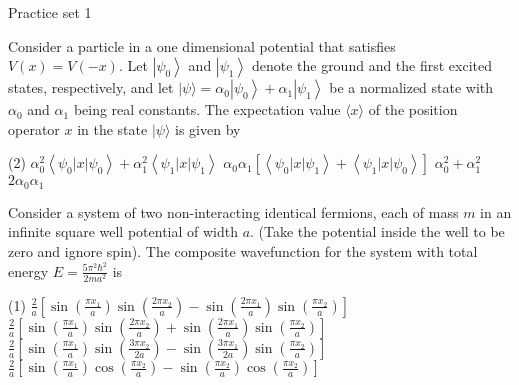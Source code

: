 \newpage
\begin{abox}
	Practice set 1
	\end{abox}
\begin{enumerate}
	\begin{minipage}{\textwidth}
		\item Consider a particle in a one dimensional potential that satisfies $V(x)=V(-x) .$ Let $\left|\psi_{0}\right\rangle$ and $\left|\psi_{1}\right\rangle$ denote the ground and the first excited states, respectively, and let $|\psi\rangle=\alpha_{0}\left|\psi_{0}\right\rangle+\alpha_{1}\left|\psi_{1}\right\rangle$ be a normalized state with $\alpha_{0}$ and $\alpha_{1}$ being real constants. The expectation value $\langle x\rangle$ of the position operator $x$ in the state $|\psi\rangle$ is given by
	\end{minipage}
	\begin{tasks}(2)
		\task[\textbf{A.}] $\alpha_{0}^{2}\left\langle\psi_{0}|x| \psi_{0}\right\rangle+\alpha_{1}^{2}\left\langle\psi_{1}|x| \psi_{1}\right\rangle$
		\task[\textbf{B.}]$\alpha_{0} \alpha_{1}\left[\left\langle\psi_{0}|x| \psi_{1}\right\rangle+\left\langle\psi_{1}|x| \psi_{0}\right\rangle\right]$
		\task[\textbf{C.}]$\alpha_{0}^{2}+\alpha_{1}^{2}$
		\task[\textbf{D.}]$2 \alpha_{0} \alpha_{1}$
	\end{tasks}
\begin{minipage}{\textwidth}
	\item Consider a system of two non-interacting identical fermions, each of mass $m$ in an infinite square well potential of width $a$. (Take the potential inside the well to be zero and ignore spin). The composite wavefunction for the system with total energy $E=\frac{5 \pi^{2} \hbar^{2}}{2 m a^{2}}$ is
\end{minipage}
\begin{tasks}(1)
	\task[\textbf{A.}] $\frac{2}{a}\left[\sin \left(\frac{\pi x_{1}}{a}\right) \sin \left(\frac{2 \pi x_{2}}{a}\right)-\sin \left(\frac{2 \pi x_{1}}{a}\right) \sin \left(\frac{\pi x_{2}}{a}\right)\right]$
	\task[\textbf{B.}]$\frac{2}{a}\left[\sin \left(\frac{\pi x_{1}}{a}\right) \sin \left(\frac{2 \pi x_{2}}{a}\right)+\sin \left(\frac{2 \pi x_{1}}{a}\right) \sin \left(\frac{\pi x_{2}}{a}\right)\right]$
	\task[\textbf{C.}]$\frac{2}{a}\left[\sin \left(\frac{\pi x_{1}}{a}\right) \sin \left(\frac{3 \pi x_{2}}{2 a}\right)-\sin \left(\frac{3 \pi x_{1}}{2 a}\right) \sin \left(\frac{\pi x_{2}}{a}\right)\right]$
	\task[\textbf{D.}]$\frac{2}{a}\left[\sin \left(\frac{\pi x_{1}}{a}\right) \cos \left(\frac{\pi x_{2}}{a}\right)-\sin \left(\frac{\pi x_{2}}{a}\right) \cos \left(\frac{\pi x_{2}}{a}\right)\right]$

\end{tasks}
\end{enumerate}
